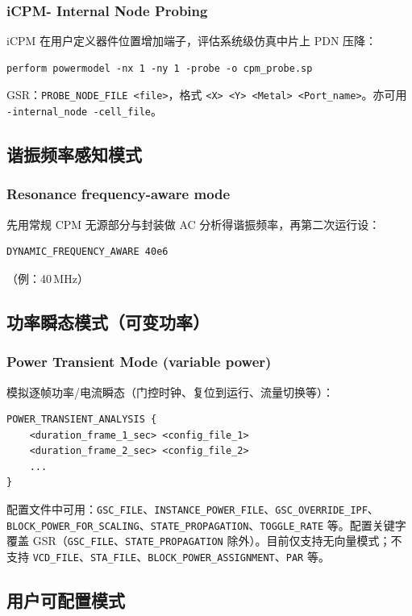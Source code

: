 \subsubsection*{iCPM- Internal Node Probing}

iCPM 在用户定义器件位置增加端子，评估系统级仿真中片上 PDN 压降：
\begin{lstlisting}
perform powermodel -nx 1 -ny 1 -probe -o cpm_probe.sp
\end{lstlisting}
GSR：\texttt{PROBE\_NODE\_FILE <file>}，格式 \texttt{<X> <Y> <Metal> <Port\_name>}。亦可用 \texttt{-internal\_node -cell\_file}。

\subsection{谐振频率感知模式}
\subsubsection*{Resonance frequency-aware mode}

先用常规 CPM 无源部分与封装做 AC 分析得谐振频率，再第二次运行设：
\begin{lstlisting}
DYNAMIC_FREQUENCY_AWARE 40e6
\end{lstlisting}
（例：40\,MHz）

\subsection{功率瞬态模式（可变功率）}
\subsubsection*{Power Transient Mode (variable power)}

模拟逐帧功率/电流瞬态（门控时钟、复位到运行、流量切换等）：
\begin{lstlisting}
POWER_TRANSIENT_ANALYSIS {
    <duration_frame_1_sec> <config_file_1>
    <duration_frame_2_sec> <config_file_2>
    ...
}
\end{lstlisting}

配置文件中可用：\texttt{GSC\_FILE}、\texttt{INSTANCE\_POWER\_FILE}、\texttt{GSC\_OVERRIDE\_IPF}、\texttt{BLOCK\_POWER\_FOR\_SCALING}、\texttt{STATE\_PROPAGATION}、\texttt{TOGGLE\_RATE} 等。配置关键字覆盖 GSR（\texttt{GSC\_FILE}、\texttt{STATE\_PROPAGATION} 除外）。目前仅支持无向量模式；不支持 \texttt{VCD\_FILE}、\texttt{STA\_FILE}、\texttt{BLOCK\_POWER\_ASSIGNMENT}、\texttt{PAR} 等。

\subsection{用户可配置模式}
